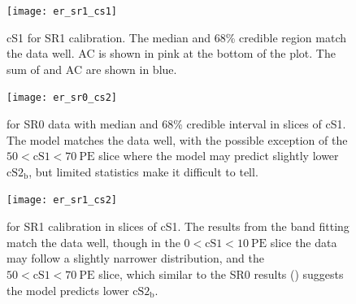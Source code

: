 \begin{figure}
\centering
\texttt{[image: er\_sr1\_cs1]}
\caption{cS1 for SR1  calibration.  The median and 68\% credible region match the data well.  AC is shown in pink at the
bottom of the plot.  The sum of  and AC are shown in blue.}
\label{fig:er_nr_calibrations_results_er_sr1_cs1}
\end{figure}

\begin{figure}
\centering
\texttt{[image: er\_sr0\_cs2]}
\caption{\cstwob for SR0  data with median and 68\% credible interval in slices of cS1.  The model matches the data well,
with the possible exception of the $50 < \mathrm{cS1} < 70\ \mathrm{PE}$ slice where the model may predict slightly lower
$\mathrm{cS2_b}$, but limited statistics make it difficult to tell.}
\label{fig:er_nr_calibrations_results_er_sr0_cs2}
\end{figure}

\begin{figure}
\centering
\texttt{[image: er\_sr1\_cs2]}
\caption{\cstwob for SR1  calibration in slices of cS1.  The results from the band fitting match the data well, though in
the $0 < \mathrm{cS1} < 10\ \mathrm{PE}$ slice the data may follow a slightly narrower distribution, and the
$50 < \mathrm{cS1} < 70\ \mathrm{PE}$ slice, which similar to the SR0 results ()
suggests the model predicts lower $\mathrm{cS2_b}$.}
\label{fig:er_nr_calibrations_results_er_sr1_cs2}
\end{figure}

